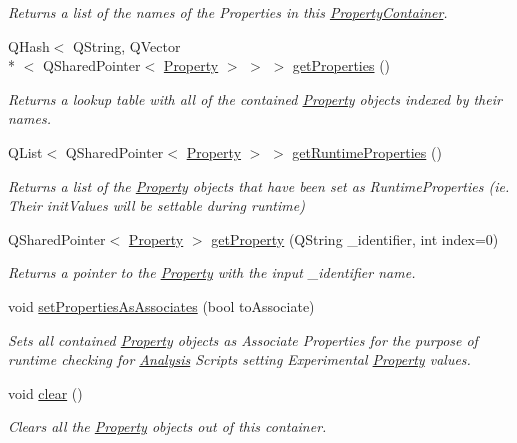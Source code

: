 \begin{DoxyCompactItemize}
\begin{DoxyCompactList}\small\item\em Returns a list of the names of the Properties in this \hyperlink{class_picto_1_1_property_container}{Property\-Container}. \end{DoxyCompactList}\item 
Q\-Hash$<$ Q\-String, Q\-Vector\\*
$<$ Q\-Shared\-Pointer$<$ \hyperlink{class_picto_1_1_property}{Property} $>$ $>$ $>$ \hyperlink{class_picto_1_1_property_container_aab57cfef3562a467b7fdac0ec8ff57a0}{get\-Properties} ()
\begin{DoxyCompactList}\small\item\em Returns a lookup table with all of the contained \hyperlink{class_picto_1_1_property}{Property} objects indexed by their names. \end{DoxyCompactList}\item 
Q\-List$<$ Q\-Shared\-Pointer$<$ \hyperlink{class_picto_1_1_property}{Property} $>$ $>$ \hyperlink{class_picto_1_1_property_container_afa4fb4cab5695bb642bb672add5590c7}{get\-Runtime\-Properties} ()
\begin{DoxyCompactList}\small\item\em Returns a list of the \hyperlink{class_picto_1_1_property}{Property} objects that have been set as Runtime\-Properties (ie. Their init\-Values will be settable during runtime) \end{DoxyCompactList}\item 
Q\-Shared\-Pointer$<$ \hyperlink{class_picto_1_1_property}{Property} $>$ \hyperlink{class_picto_1_1_property_container_af52be20feb3dea784778744090212ea2}{get\-Property} (Q\-String \-\_\-identifier, int index=0)
\begin{DoxyCompactList}\small\item\em Returns a pointer to the \hyperlink{class_picto_1_1_property}{Property} with the input \-\_\-identifier name. \end{DoxyCompactList}\item 
void \hyperlink{class_picto_1_1_property_container_a3b68b27d46b130e46386e356f17dd5a9}{set\-Properties\-As\-Associates} (bool to\-Associate)
\begin{DoxyCompactList}\small\item\em Sets all contained \hyperlink{class_picto_1_1_property}{Property} objects as Associate Properties for the purpose of runtime checking for \hyperlink{class_picto_1_1_analysis}{Analysis} Scripts setting Experimental \hyperlink{class_picto_1_1_property}{Property} values. \end{DoxyCompactList}\item 
void \hyperlink{class_picto_1_1_property_container_a6b76b949dbb3fd855a052ecc6335ebb3}{clear} ()
\begin{DoxyCompactList}\small\item\em Clears all the \hyperlink{class_picto_1_1_property}{Property} objects out of this container. \end{DoxyCompactList}\end{DoxyCompactItemize}
